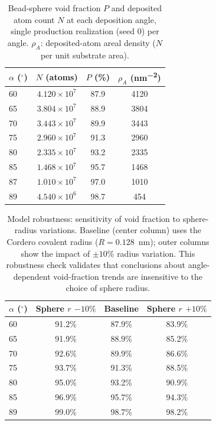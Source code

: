 \documentclass[aip,amsmath,amssymb,reprint]{revtex4-1}
\newcommand{\dang}{\ensuremath{\alpha}}
\newcommand{\bsP}{\ensuremath{P}}
\begin{document}
\begin{table}[htbp]
  \centering
  \caption{%
    Bead-sphere void fraction $\bsP$ and deposited atom count $N$ at each
    deposition angle, single production realization (seed 0) per angle.
    $\rho_A$: deposited-atom areal density ($N$ per unit substrate area).
  }
  \label{tab:repro}
  \begin{tabular}{lccc}
    \toprule
    $\dang$ ($^{\circ}$) & $N$ (atoms) & $\bsP$ (\%) & $\rho_A$ (\si{nm^{-2}}) \\
    \midrule
    60 & $4.120\times10^{7}$ & 87.9 & 4120 \\
    65 & $3.804\times10^{7}$ & 88.9 & 3804 \\
    70 & $3.443\times10^{7}$ & 89.9 & 3443 \\
    75 & $2.960\times10^{7}$ & 91.3 & 2960 \\
    80 & $2.335\times10^{7}$ & 93.2 & 2335 \\
    85 & $1.468\times10^{7}$ & 95.7 & 1468 \\
    87 & $1.010\times10^{7}$ & 97.0 & 1010 \\  %
    89 & $4.540\times10^{6}$ & 98.7 & 454 \\
    \bottomrule
  \end{tabular}
\end{table}

\begin{table}[htbp]
  \centering
  \caption{%
    Model robustness: sensitivity of void fraction to sphere-radius variations.
    Baseline (center column) uses the Cordero covalent radius ($R = 0.128$~nm);
    outer columns show the impact of $\pm 10\%$ radius variation.
    This robustness check validates that conclusions about angle-dependent
    void-fraction trends are insensitive to the choice of sphere radius.}
  \label{tab:sensitivity}
  \begin{tabular}{lccc}
    \toprule
    $\dang$ ($^{\circ}$) & Sphere $r$ $-10\%$ & Baseline & Sphere $r$ $+10\%$ \\
    \midrule
    60 & 91.2\% & 87.9\% & 83.9\% \\
    65 & 91.9\% & 88.9\% & 85.2\% \\
    70 & 92.6\% & 89.9\% & 86.6\% \\
    75 & 93.7\% & 91.3\% & 88.5\% \\
    80 & 95.0\% & 93.2\% & 90.9\% \\
    85 & 96.9\% & 95.7\% & 94.3\% \\
    89 & 99.0\% & 98.7\% & 98.2\% \\
    \bottomrule
  \end{tabular}
\end{table}
\end{document}
